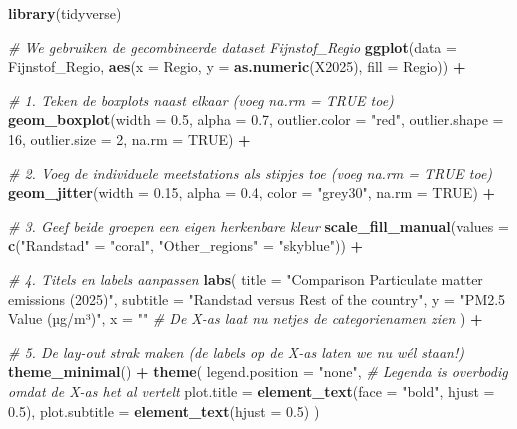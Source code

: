 \documentclass[
]{article}
\newenvironment{Shaded}{\begin{snugshade}}{\end{snugshade}}
\newcommand{\AttributeTok}[1]{\textcolor[rgb]{0.13,0.29,0.53}{#1}}
\newcommand{\CommentTok}[1]{\textcolor[rgb]{0.56,0.35,0.01}{\textit{#1}}}
\newcommand{\ConstantTok}[1]{\textcolor[rgb]{0.56,0.35,0.01}{#1}}
\newcommand{\DecValTok}[1]{\textcolor[rgb]{0.00,0.00,0.81}{#1}}
\newcommand{\FloatTok}[1]{\textcolor[rgb]{0.00,0.00,0.81}{#1}}
\newcommand{\FunctionTok}[1]{\textcolor[rgb]{0.13,0.29,0.53}{\textbf{#1}}}
\newcommand{\NormalTok}[1]{#1}
\newcommand{\OtherTok}[1]{\textcolor[rgb]{0.56,0.35,0.01}{#1}}
\newcommand{\SpecialCharTok}[1]{\textcolor[rgb]{0.81,0.36,0.00}{\textbf{#1}}}
\newcommand{\StringTok}[1]{\textcolor[rgb]{0.31,0.60,0.02}{#1}}
\begin{document}
\begin{Shaded}
\begin{Highlighting}[]
\FunctionTok{library}\NormalTok{(tidyverse)}

\CommentTok{\# We gebruiken de gecombineerde dataset \textquotesingle{}Fijnstof\_Regio\textquotesingle{}}
\FunctionTok{ggplot}\NormalTok{(}\AttributeTok{data =}\NormalTok{ Fijnstof\_Regio, }\FunctionTok{aes}\NormalTok{(}\AttributeTok{x =}\NormalTok{ Regio, }\AttributeTok{y =} \FunctionTok{as.numeric}\NormalTok{(}\StringTok{\textasciigrave{}}\AttributeTok{X2025}\StringTok{\textasciigrave{}}\NormalTok{), }\AttributeTok{fill =}\NormalTok{ Regio)) }\SpecialCharTok{+}
  
\CommentTok{\# 1. Teken de boxplots naast elkaar (voeg na.rm = TRUE toe)}
\FunctionTok{geom\_boxplot}\NormalTok{(}\AttributeTok{width =} \FloatTok{0.5}\NormalTok{, }\AttributeTok{alpha =} \FloatTok{0.7}\NormalTok{,}
             \AttributeTok{outlier.color =} \StringTok{"red"}\NormalTok{, }\AttributeTok{outlier.shape =} \DecValTok{16}\NormalTok{, }\AttributeTok{outlier.size =} \DecValTok{2}\NormalTok{,}
             \AttributeTok{na.rm =} \ConstantTok{TRUE}\NormalTok{) }\SpecialCharTok{+}

\CommentTok{\# 2. Voeg de individuele meetstations als stipjes toe (voeg na.rm = TRUE toe)}
\FunctionTok{geom\_jitter}\NormalTok{(}\AttributeTok{width =} \FloatTok{0.15}\NormalTok{, }\AttributeTok{alpha =} \FloatTok{0.4}\NormalTok{, }\AttributeTok{color =} \StringTok{"grey30"}\NormalTok{, }
            \AttributeTok{na.rm =} \ConstantTok{TRUE}\NormalTok{) }\SpecialCharTok{+}
  
  \CommentTok{\# 3. Geef beide groepen een eigen herkenbare kleur}
  \FunctionTok{scale\_fill\_manual}\NormalTok{(}\AttributeTok{values =} \FunctionTok{c}\NormalTok{(}\StringTok{"Randstad"} \OtherTok{=} \StringTok{"coral"}\NormalTok{, }\StringTok{"Other\_regions"} \OtherTok{=} \StringTok{"skyblue"}\NormalTok{)) }\SpecialCharTok{+}
  
  \CommentTok{\# 4. Titels en labels aanpassen}
  \FunctionTok{labs}\NormalTok{(}
    \AttributeTok{title =} \StringTok{"Comparison Particulate matter emissions (2025)"}\NormalTok{,}
    \AttributeTok{subtitle =} \StringTok{"Randstad versus Rest of the country"}\NormalTok{,}
    \AttributeTok{y =} \StringTok{"PM2.5 Value (µg/m³)"}\NormalTok{,}
    \AttributeTok{x =} \StringTok{""} \CommentTok{\# De X{-}as laat nu netjes de categorienamen zien}
\NormalTok{  ) }\SpecialCharTok{+}
  
  \CommentTok{\# 5. De lay{-}out strak maken (de labels op de X{-}as laten we nu wél staan!)}
  \FunctionTok{theme\_minimal}\NormalTok{() }\SpecialCharTok{+}
  \FunctionTok{theme}\NormalTok{(}
    \AttributeTok{legend.position =} \StringTok{"none"}\NormalTok{, }\CommentTok{\# Legenda is overbodig omdat de X{-}as het al vertelt}
    \AttributeTok{plot.title =} \FunctionTok{element\_text}\NormalTok{(}\AttributeTok{face =} \StringTok{"bold"}\NormalTok{, }\AttributeTok{hjust =} \FloatTok{0.5}\NormalTok{),}
    \AttributeTok{plot.subtitle =} \FunctionTok{element\_text}\NormalTok{(}\AttributeTok{hjust =} \FloatTok{0.5}\NormalTok{)}
\NormalTok{  )}
\end{Highlighting}
\end{Shaded}
\end{document}
